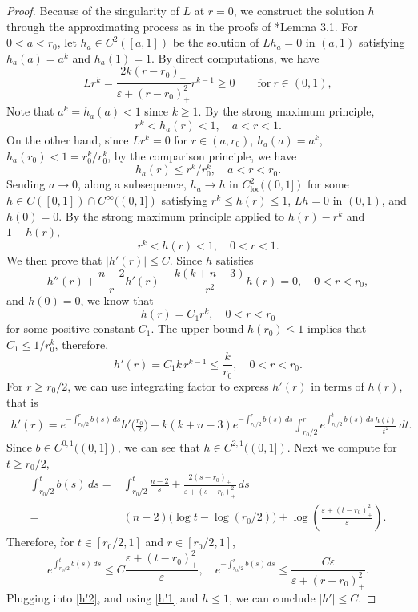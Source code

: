 \documentclass[reqno, 10pt]{amsart}
\theoremstyle{plain}
\theoremstyle{definition}
\theoremstyle{remark}
\numberwithin{equation}{section}
\begin{document}
\begin{proof}
Because of the singularity of $L$ at $r = 0$, we construct the solution $h$ through the approximating process as in the proofs of \cite{DLY}*{Lemma 3.1}. For $0 < a < r_0$, let $h_a \in C^2([a,1])$ be the solution of $Lh_a = 0$ in $(a, 1)$ satisfying $h_a(a) = a^k$ and $h_a(1) = 1$. By direct computations, we have
\begin{equation*}
Lr^k =  \frac{2k(r-r_0)_+}{\varepsilon + (r-r_0)_+^2} r^{k-1}\ge 0 \quad\quad \mbox{for}~r\in(0,1),
\end{equation*}
Note that $a^k=h_a(a)< 1$ since $k\ge 1$.
By the strong maximum principle,
$$
r^k< h_a(r) < 1, \quad a < r < 1.
$$
On the other hand, since $Lr^k=0$ for $r\in(a,r_0)$, $h_a(a)=a^k$, $h_a(r_0)<1=r_0^k/r_0^k$, by the comparison principle, we have 
$$h_a(r)\le r^k/r_0^k, \quad a<r<r_0.$$
Sending $a \to 0$, along a subsequence, $h_a \to h$ in $C^2_{\text{loc}}((0,1])$ for some $h \in C([0,1]) \cap C^\infty((0,1])$ satisfying $r^k \le h(r) \le 1$, $Lh = 0$ in $(0,1)$, and $h(0) = 0$. By the strong maximum principle applied to $h(r) - r^k$ and $1 - h(r)$,
$$
r ^k< h(r) < 1, \quad 0 < r < 1.
$$
We then prove that $|h'(r)| \le C$. Since $h$ satisfies
$$
h''(r) + \frac{n-2}{r} h'(r) -\frac{k(k+n-3)}{r^2} h(r) = 0, \quad 0 < r < r_0,
$$
and $h(0) = 0$, we know that
$$
h(r) = C_1r^k, \quad 0 < r < r_0
$$
for some positive constant $C_1$. The upper bound $h(r_0) \le 1$ implies that $C_1 \le 1/r_0^k$, therefore,
\begin{equation}\label{h'1}
h'(r) = C_1k\,r^{k-1} \le \frac{k}{r_0}, \quad 0 < r < r_0.
\end{equation}
For $r \ge r_0/2$, we can use integrating factor to express $h'(r)$ in terms of $h(r)$, that is
\begin{equation}\label{h'2}
\begin{aligned}
h'(r) = e^{-\int_{r_0/2}^r b(s) \, ds} h'\Big(\frac{r_0}{2}\Big) + k(k+n-3) e^{-\int_{r_0/2}^r b(s) \, ds} \int_{r_0/2}^r e^{\int_{r_0/2}^t b(s) \, ds} \frac{h(t)}{t^2} \, dt.
\end{aligned}
\end{equation}
Since $b \in  C^{0,1}((0,1])$, we can see that $h \in  C^{2,1}((0,1])$. Next we compute for $t \ge r_0/2$,
\begin{equation}\label{integral_b}
\begin{aligned}
\int_{r_0/2}^t b(s) \, ds =& \int_{r_0/2}^t \frac{n-2}{s} + \frac{2(s-r_0)_+}{\varepsilon + (s - r_0)_+^2} \, ds\\
=& (n-2) \Big( \log t - \log (r_0/2) \Big) + \log \left( \frac{\varepsilon + (t - r_0)_+^2}{\varepsilon} \right).
\end{aligned}
\end{equation}
Therefore, for $t \in [r_0/2,1]$ and $r \in [r_0/2,1]$,
$$
e^{\int_{r_0/2}^t b(s) \, ds} \le C \frac{\varepsilon + (t - r_0)_+^2}{\varepsilon}, \quad e^{-\int_{r_0/2}^r b(s) \, ds} \le  \frac{C\varepsilon}{\varepsilon + (r - r_0)_+^2}.
$$
Plugging into \eqref{h'2}, and using \eqref{h'1} and $h \le 1$, we can conclude $|h'| \le C$.
\end{proof}
\end{document}

